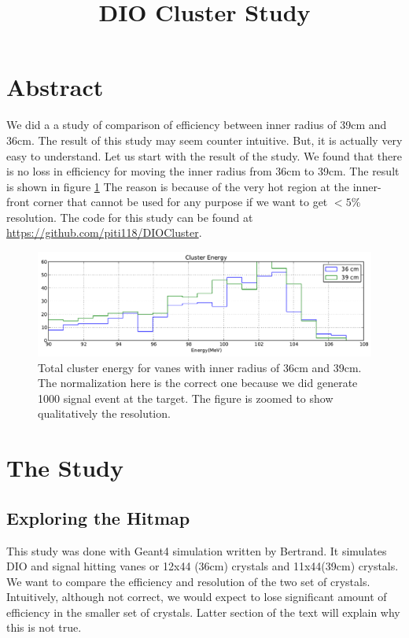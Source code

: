 \documentclass[11pt]{article}
\title{DIO Cluster Study}
\begin{document}
\maketitle

\section{Abstract}

We did a a study of comparison of efficiency between inner radius of 39cm and 36cm. The result of this study may seem counter intuitive. But, it is actually very easy to understand. Let us start with the result of the study. We found that there is no loss in efficiency for moving the inner radius from 36cm to 39cm. The result is shown in figure \ref{fig:cluster_energy} The reason is because of the very hot region at the inner-front corner that cannot be used for any purpose if we want to get $<5\%$ resolution. The code for this study can be found at \url{https://github.com/piti118/DIOCluster}.
\begin{figure}[htbp]
   \centering
   \includegraphics[width=\textwidth]{../plot/clusterenergy.pdf} %
   \caption{Total cluster energy for vanes with inner radius of 36cm and 39cm. The normalization here is the correct one because we did generate 1000 signal event at the target. The figure is zoomed to show qualitatively the resolution.}
   \label{fig:cluster_energy}
\end{figure}

\section{The Study}
\subsection{Exploring the Hitmap}
This study was done with Geant4 simulation written by Bertrand. It simulates DIO and signal hitting vanes or 12x44 (36cm) crystals and 11x44(39cm) crystals. We want to compare the efficiency and resolution of the two set of crystals. Intuitively, although not correct, we would expect to lose significant amount of efficiency in the smaller set of crystals. Latter section of the text will explain why this is not true. 
\end{document}
